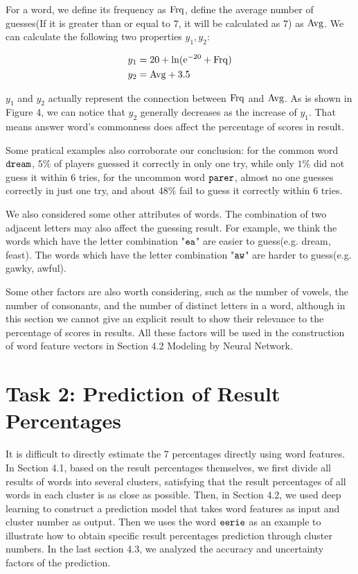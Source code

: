 For a word, we define its frequency as $\rm{Frq}$, define the average number of guesses(If it is greater than or equal to $7$, it will be calculated as $7$) as $\rm{Avg}$. We can calculate the following two properties $y_1, y_2$:

\begin{equation}
	\begin{aligned}
		&y_1 = 20 + \ln (\rm e^{-20} +\rm{Frq})\\
		&y_2 = \rm{Avg} + 3.5
	\end{aligned}
\end{equation}

$y_1$ and $y_2$ actually represent the connection between $\rm{Frq}$ and $\rm{Avg}$. As is shown in Figure 4, we can notice that $y_2$ generally decreases as the increase of $y_1$. That means answer word's commonness does affect the percentage of scores in result.

Some pratical examples  also corroborate our conclusion: for the common word $\tt dream$, $5\%$ of players guessed it correctly in only one try, while only $1\%$ did not guess it within 6 tries, for the uncommon word $\tt parer$, almost no one guesses correctly in just one try, and about $48\%$ fail to guess it correctly within 6 tries. 

We also considered some other attributes of words. The combination of two adjacent letters may also affect the guessing result. For example, we think the words which have the letter combination "$\tt ea$" are easier to guess(e.g. dream, feast). The words which have the letter combination "$\tt aw$" are harder to guess(e.g. gawky, awful).

Some other factors are also worth considering, such as the number of vowels, the number of consonants, and the number of distinct letters in a word, although in this section we cannot give an explicit result to show their relevance to the percentage of scores in results. All these factors will be used in the construction of word feature vectors in Section 4.2 Modeling by Neural Network.

\section{Task 2: Prediction of Result Percentages}

It is difficult to directly estimate the 7 percentages directly using word features. In Section 4.1, based on the result percentages themselves, we first divide all results of words into several clusters, satisfying that the result percentages of all words in each cluster is as close as possible. Then, in Section 4.2, we used deep learning to construct a prediction model that takes word features as input and cluster number as output. Then we uses the word $\tt eerie$ as an example to illustrate how to obtain specific result percentages prediction through cluster numbers. In the last section 4.3, we analyzed the accuracy and uncertainty factors of the prediction.

